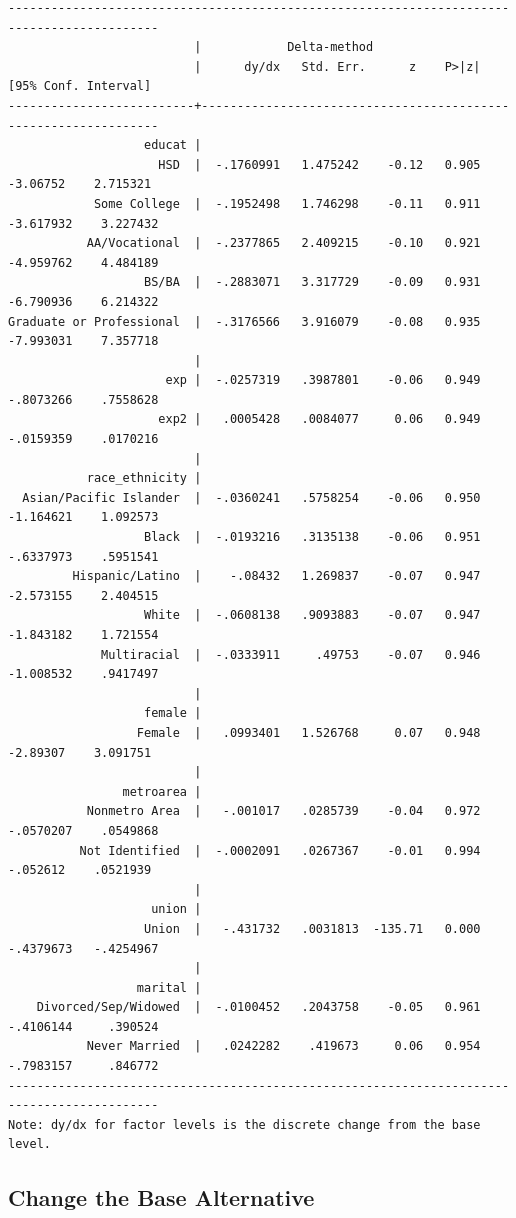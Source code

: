 \documentclass[
]{book}
\begin{document}
\begin{verbatim}
-------------------------------------------------------------------------------------------
                          |            Delta-method
                          |      dy/dx   Std. Err.      z    P>|z|     [95% Conf. Interval]
--------------------------+----------------------------------------------------------------
                   educat |
                     HSD  |  -.1760991   1.475242    -0.12   0.905     -3.06752    2.715321
            Some College  |  -.1952498   1.746298    -0.11   0.911    -3.617932    3.227432
           AA/Vocational  |  -.2377865   2.409215    -0.10   0.921    -4.959762    4.484189
                   BS/BA  |  -.2883071   3.317729    -0.09   0.931    -6.790936    6.214322
Graduate or Professional  |  -.3176566   3.916079    -0.08   0.935    -7.993031    7.357718
                          |
                      exp |  -.0257319   .3987801    -0.06   0.949    -.8073266    .7558628
                     exp2 |   .0005428   .0084077     0.06   0.949    -.0159359    .0170216
                          |
           race_ethnicity |
  Asian/Pacific Islander  |  -.0360241   .5758254    -0.06   0.950    -1.164621    1.092573
                   Black  |  -.0193216   .3135138    -0.06   0.951    -.6337973    .5951541
         Hispanic/Latino  |    -.08432   1.269837    -0.07   0.947    -2.573155    2.404515
                   White  |  -.0608138   .9093883    -0.07   0.947    -1.843182    1.721554
             Multiracial  |  -.0333911     .49753    -0.07   0.946    -1.008532    .9417497
                          |
                   female |
                  Female  |   .0993401   1.526768     0.07   0.948     -2.89307    3.091751
                          |
                metroarea |
           Nonmetro Area  |   -.001017   .0285739    -0.04   0.972    -.0570207    .0549868
          Not Identified  |  -.0002091   .0267367    -0.01   0.994     -.052612    .0521939
                          |
                    union |
                   Union  |   -.431732   .0031813  -135.71   0.000    -.4379673   -.4254967
                          |
                  marital |
    Divorced/Sep/Widowed  |  -.0100452   .2043758    -0.05   0.961    -.4106144     .390524
           Never Married  |   .0242282    .419673     0.06   0.954    -.7983157     .846772
-------------------------------------------------------------------------------------------
Note: dy/dx for factor levels is the discrete change from the base level.
\end{verbatim}

\subsection{Change the Base Alternative}\label{change-the-base-alternative}
\end{document}
